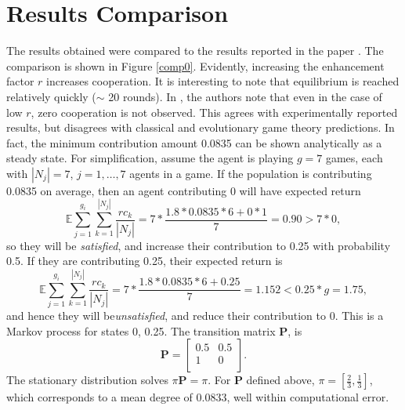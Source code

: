 \section{Results Comparison}
The results obtained were compared to the results reported in the paper \cite{RN49}. The comparison is shown in Figure \ref{comp0}. Evidently, increasing the enhancement factor $r$ increases cooperation. It is interesting to note that equilibrium is reached relatively quickly ($\sim$ 20 rounds). In \cite{RN49}, the authors note that even in the case of low $r$, zero cooperation is not observed. This agrees with experimentally reported results, but disagrees with classical and evolutionary game theory predictions. In fact, the minimum contribution amount 0.0835 can be shown analytically as a steady state. For simplification, assume the agent is playing $g=7$ games, each with $|N_j|=7$, $j=1, \dots, 7$ agents in a game. If the population is contributing 0.0835 on average, then  an agent contributing 0 will have expected return $$ \mathbb E \sum_{j=1}^{g_i} \sum_{k=1}^{|N_j|} \frac{rc_k}{|N_j|} =   7*\frac{1.8*0.0835*6 + 0*1}{7} =  0.90 >7*0,$$ so they will be \emph{satisfied}, and increase their contribution to 0.25 with probability 0.5. If they are contributing 0.25, their expected return is 
$$ \mathbb E \sum_{j=1}^{g_i} \sum_{k=1}^{|N_j|} \frac{rc_k}{|N_j|} =7* \frac{1.8*0.0835*6 + 0.25}{7} = 1.152< 0.25*g  =1.75, $$
 and hence they will be\emph{unsatisfied}, and reduce their contribution to 0. This is a Markov process for states 0, 0.25. The transition matrix $\mathbf{P}$, is $$\mathbf P = \begin{bmatrix} 0.5& 0.5 \\
1& 0 \\
\end{bmatrix}. $$ The stationary distribution solves $\pi \mathbf{P} = \pi$. For $\mathbf{P}$ defined above, $\pi = [\tfrac{2}{3}, \tfrac{1}{3}]$, which corresponds to a mean degree of 0.0833, well within computational error. 

